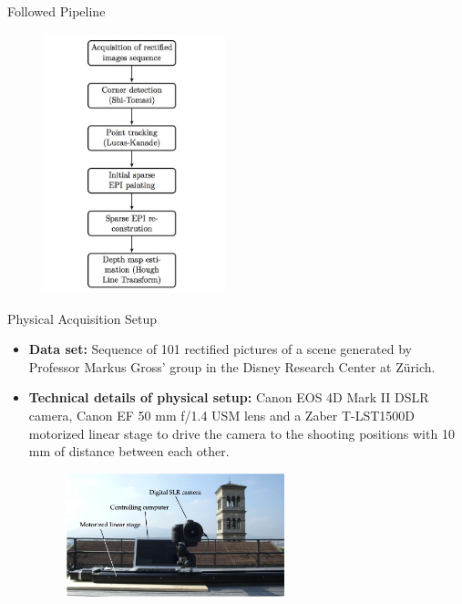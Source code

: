 \begin{frame}{Followed Pipeline}

\begin{figure}[h!]
\includegraphics[width=0.47\textwidth]{./images/pipeline.jpg}
\end{figure}

\end{frame}

\begin{frame}{Physical Acquisition Setup}
\begin{block}{}
\begin{itemize}
\item \textbf{Data set:} Sequence of 101 rectified pictures of a scene generated by Professor Markus Gross' group in the Disney Research Center at Z\"urich.
\pause
\item \textbf{Technical details of physical setup:} Canon EOS 4D Mark II DSLR camera, Canon EF 50 mm f/1.4 USM lens and a Zaber T-LST1500D motorized linear stage to drive the camera to the shooting positions with 10 mm of distance between each other. 
\pause
\begin{figure}[h!]
\includegraphics[width=0.6\textwidth]{./images/setting.jpg}
\end{figure}
\end{itemize}
\end{block}
\end{frame}

